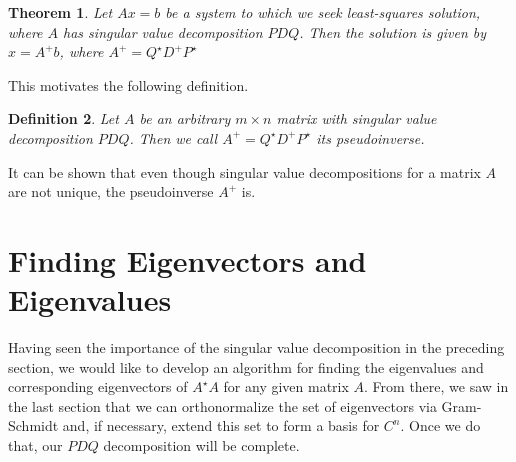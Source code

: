 \documentclass[12pt,reqno]{amsart}
\numberwithin{equation}{section}  %
\newtheorem{theorem}{Theorem}[section]
\newtheorem{definition}[theorem]{Definition}
\begin{document}
\begin{theorem}
Let $Ax = b$ be a system to which we seek least-squares solution, where
$A$ has singular value decomposition $PDQ$.
Then the solution is given by $x = A^{+}b$, where $A^{+} = Q^{\star} D^{+} P^{\star}$
\end{theorem}
This motivates the following definition.
\begin{definition}
Let $A$ be an arbitrary $m \times n$ matrix with singular value decomposition $PDQ$. 
Then we call $A^{+} = Q^{\star}D^{+} P^{\star}$ its \emph{pseudoinverse}.
\end{definition}
It can be shown that even though singular value decompositions for a matrix $A$ are not
unique, the pseudoinverse $A^{+}$ is. 
\section{Finding Eigenvectors and Eigenvalues}
Having seen the importance of the singular value decomposition in the preceding
section, we would like to develop an algorithm for finding the eigenvalues and
corresponding eigenvectors of $A^{\star}A$ for any given matrix $A$. From there,
we saw in the last section that we can orthonormalize the set of eigenvectors
via Gram-Schmidt and, if necessary, extend this set to form a basis for $C^{n}$.
Once we do that, our $PDQ$ decomposition will be complete.
\end{document}
